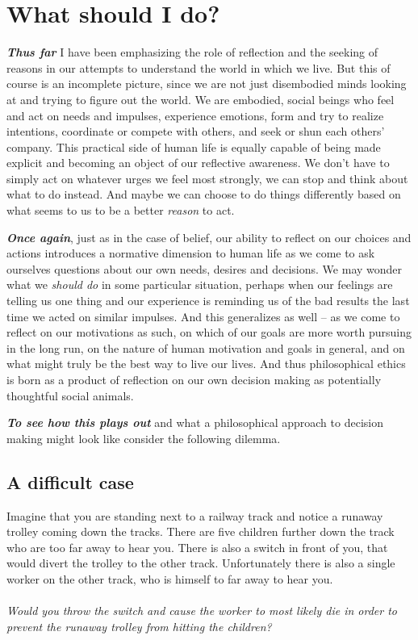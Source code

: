 \documentclass[12pt, openany]{book}
\makeatletter
\newenvironment{kframe}{%
\medskip{}
\setlength{\fboxsep}{.8em}
 \def\at@end@of@kframe{}%
 \ifinner\ifhmode%
  \def\at@end@of@kframe{\end{minipage}}%
  \begin{minipage}{\columnwidth}%
 \fi\fi%
 \def\FrameCommand##1{\hskip\@totalleftmargin \hskip-\fboxsep
 \colorbox{shadecolor}{##1}\hskip-\fboxsep
     \hskip-\linewidth \hskip-\@totalleftmargin \hskip\columnwidth}%
 \MakeFramed {\advance\hsize-\width
   \@totalleftmargin\z@ \linewidth\hsize
   \@setminipage}}%
 {\par\unskip\endMakeFramed%
 \at@end@of@kframe}
\newenvironment{rmdblock}[1]
  {
  \begin{itemize}
  \renewcommand{\labelitemi}{
    \raisebox{-.7\height}[0pt][0pt]{
      {\setkeys{Gin}{width=3em,keepaspectratio}\texttt{[image: img/\#1]}}
    }
  }
  \setlength{\fboxsep}{1em}
  \begin{kframe}
  \item
  }
  {
  \end{kframe}
  \end{itemize}
  }
\newenvironment{question}
  {\begin{rmdblock}{question}}
  {\end{rmdblock}}
\makeatother
\begin{document}
\hypertarget{what-should-i-do}{%
\section{What should I do?}\label{what-should-i-do}}

\textbf{\emph{Thus far}} I have been emphasizing the role of reflection and the seeking of reasons in our attempts to understand the world in which we live. But this of course is an incomplete picture, since we are not just disembodied minds looking at and trying to figure out the world. We are embodied, social beings who feel and act on needs and impulses, experience emotions, form and try to realize intentions, coordinate or compete with others, and seek or shun each others' company. This practical side of human life is equally capable of being made explicit and becoming an object of our reflective awareness. We don't have to simply act on whatever urges we feel most strongly, we can stop and think about what to do instead. And maybe we can choose to do things differently based on what seems to us to be a better \emph{reason} to act.

\textbf{\emph{Once again}}, just as in the case of belief, our ability to reflect on our choices and actions introduces a normative dimension to human life as we come to ask ourselves questions about our own needs, desires and decisions. We may wonder what we \emph{should do} in some particular situation, perhaps when our feelings are telling us one thing and our experience is reminding us of the bad results the last time we acted on similar impulses. And this generalizes as well -- as we come to reflect on our motivations as such, on which of our goals are more worth pursuing in the long run, on the nature of human motivation and goals in general, and on what might truly be the best way to live our lives. And thus philosophical ethics is born as a product of reflection on our own decision making as potentially thoughtful social animals.

\textbf{\emph{To see how this plays out}} and what a philosophical approach to decision making might look like consider the following dilemma.

\hypertarget{a-difficult-case}{%
\subsection*{A difficult case}\label{a-difficult-case}}


\begin{question}

Imagine that you are standing next to a railway track and notice a runaway trolley coming down the tracks. There are five children further down the track who are too far away to hear you. There is also a switch in front of you, that would divert the trolley to the other track. Unfortunately there is also a single worker on the other track, who is himself to far away to hear you.\\
~\\
\emph{Would you throw the switch and cause the worker to most likely die in order to prevent the runaway trolley from hitting the children?}

\end{question}
\end{document}
